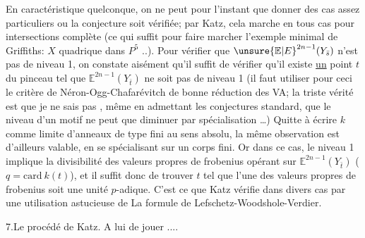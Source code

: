 En caractéristique quelconque, on ne peut pour l'instant que donner des cas assez particuliers ou la conjecture soit vérifiée; par Katz, cela marche en tous cas pour  intersections complète (ce qui suffit pour faire marcher l'exemple minimal de Griffiths: $X$ quadrique dans $P^5$ ..).  Pour vérifier que ${\unsure{\mathbb{E}|E}}^{2n-1}(Y_{\bar s})$ n'est pas de niveau 1, on constate aisément qu'il suffit de vérifier qu'il existe \uline{un} point $t$ du pinceau tel que $\mathbb{E}^{2n-1}(Y_{\bar t})$ ne soit pas de niveau 1 (il faut utiliser pour ceci le critère de Néron-Ogg-Chafarévitch de bonne réduction des VA; la triste vérité est que je ne sais pas , même en  admettant les conjectures standard, que le niveau d'un motif ne peut que diminuer par spécialisation \ldots) Quitte à écrire $k$ comme limite d'anneaux de type fini au sens absolu, la même observation est d'ailleurs valable, en se spécialisant sur un corps fini. Or dans ce cas, le niveau 1 implique la divisibilité  des valeurs propres de frobenius opérant sur $\mathbb{E}^{2n-1}(Y_{\bar t})$  ($q=\mathrm{card}\ k(t)$), et il suffit donc de trouver $t$ tel que l'une des valeurs propres de frobenius soit une unité $p$-adique. C'est ce que Katz vérifie dans divers cas par une utilisation astucieuse de La formule de Lefschetz-Woodshole-Verdier.

7.\quad Le procédé de Katz. A lui de jouer ....
